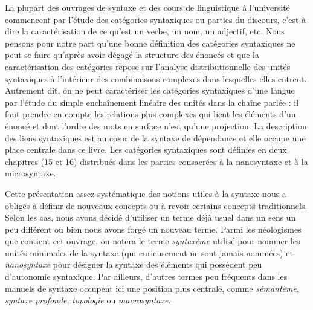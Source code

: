 La plupart des ouvrages de syntaxe et des cours de linguistique à l’université commencent par l’étude des catégories syntaxiques ou parties du discours, c’est-à-dire la caractérisation de ce qu’est un verbe, un nom, un adjectif, etc. Nous pensons pour notre part qu’une bonne définition des catégories syntaxiques ne peut se faire qu’après avoir dégagé la structure des énoncés et que la caractérisation des catégories repose sur l’analyse distributionnelle des unités syntaxiques à l’intérieur des combinaisons complexes dans lesquelles elles entrent. Autrement dit, on ne peut caractériser les catégories syntaxiques d’une langue par l’étude du simple enchaînement linéaire des unités dans la chaîne parlée : il faut prendre en compte les relations plus complexes qui lient les éléments d’un énoncé et dont l’ordre des mots en surface n’est qu’une projection. La description des liens syntaxiques est au cœur de la syntaxe de dépendance et elle occupe une place centrale dans ce livre. Les catégories syntaxiques sont définies en deux chapitres (15 et 16)
distribués dans les parties consacrées à la nanosyntaxe et à la microsyntaxe.

Cette présentation assez systématique des notions utiles à la syntaxe nous a obligés à définir de nouveaux concepts ou à revoir certains concepts traditionnels. Selon les cas, nous avons décidé d’utiliser un terme déjà usuel dans un sens un peu différent ou bien nous avons forgé un nouveau terme. Parmi les néologismes que contient cet ouvrage, on notera le terme \textit{syntaxème} utilisé pour nommer les unités minimales de la syntaxe (qui curieusement ne sont jamais nommées) et \textit{nanosyntaxe} pour désigner la syntaxe des éléments qui possèdent peu d’autonomie syntaxique. Par ailleurs, d’autres termes peu fréquents dans les manuels de syntaxe occupent ici une position plus centrale, comme \textit{sémantème}, \textit{syntaxe profonde}, \textit{topologie} ou \textit{macrosyntaxe}.

